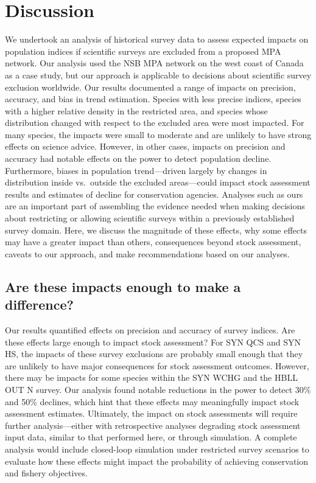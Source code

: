 \documentclass[12pt]{article}
\begin{document}
\section*{Discussion}

We undertook an analysis of historical survey data to assess expected impacts on population indices if scientific surveys are excluded from a proposed MPA network.
Our analysis used the NSB MPA network on the west coast of Canada as a case study, but our approach is applicable to decisions about scientific survey exclusion worldwide.
Our results documented a range of impacts on precision, accuracy, and bias in trend estimation.
Species with less precise indices, species with a higher relative density in the restricted area, and species whose distribution changed with respect to the excluded area were most impacted.
For many species, the impacts were small to moderate and are unlikely to have strong effects on science advice.
However, in other cases, impacts on precision and accuracy had notable effects on the power to detect population decline.
Furthermore, biases in population trend---driven largely by changes in distribution inside vs.\ outside the excluded areas---could impact stock assessment results and estimates of decline for conservation agencies.
Analyses such as ours are an important part of assembling the evidence needed when making decisions about restricting or allowing scientific surveys within a previously established survey domain.
Here, we discuss the magnitude of these effects, why some effects may have a greater impact than others, consequences beyond stock assessment, caveats to our approach, and make recommendations based on our analyses.

\subsection*{Are these impacts enough to make a difference?}

Our results quantified effects on precision and accuracy of survey indices.
Are these effects large enough to impact stock assessment?
For SYN QCS and SYN HS, the impacts of these survey exclusions are probably small enough that they are unlikely to have major consequences for stock assessment outcomes.
However, there may be impacts for some species within the SYN WCHG and the HBLL OUT N survey.
Our analysis found notable reductions in the power to detect 30\% and 50\% declines, which hint that these effects may meaningfully impact stock assessment estimates.
Ultimately, the impact on stock assessments will require further analysis---either with retrospective analyses degrading stock assessment input data, similar to that performed here, or through simulation.
A complete analysis would include closed-loop simulation \citep{smith1999, punt2016} under restricted survey scenarios to evaluate how these effects might impact the probability of achieving conservation and fishery objectives.
\end{document}

